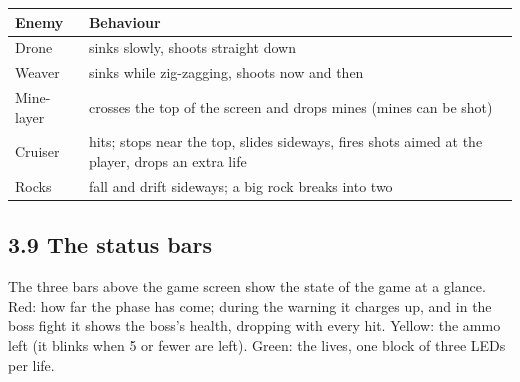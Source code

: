 \documentclass[11pt,a4paper]{article}
\begin{document}
\par\noindent\begin{minipage}{\linewidth}\centering\small
\begin{tabular}{|>{\raggedright\arraybackslash}p{2.91cm}|>{\raggedright\arraybackslash}p{13.59cm}|}
\hline\rowcolor{accent}\textbf{\color{white}Enemy} & \textbf{\color{white}Behaviour}\\\hline
Drone & sinks slowly, shoots straight down\\\hline
\rowcolor{rowshade}Weaver & sinks while zig-zagging, shoots now and then\\\hline
Mine-layer & crosses the top of the screen and drops mines (mines can be shot)\\\hline
\rowcolor{rowshade}Cruiser & 5 hits; stops near the top, slides sideways, fires shots aimed at the player, drops an extra life\\\hline
Rocks & fall and drift sideways; a big rock breaks into two\\\hline
\end{tabular}
\end{minipage}\par\medskip

\subsection*{3.9 The status bars}
The three bars above the game screen show the state of the game at a glance. Red: how far the phase has come; during the warning it charges up, and in the boss fight it shows the boss's health, dropping with every hit. Yellow: the ammo left (it blinks when 5 or fewer are left). Green: the lives, one block of three LEDs per life.
\end{document}
